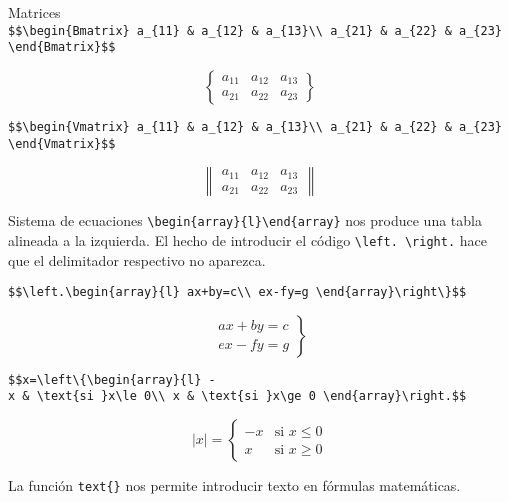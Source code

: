 \documentclass[
  ignorenonframetext,
]{beamer}
\begin{document}
\begin{frame}[fragile]{Matrices}
\label{matrices-2}
\texttt{\$\$\textbackslash{}begin\{Bmatrix\}\ a\_\{11\}\ \&\ a\_\{12\}\ \&\ a\_\{13\}\textbackslash{}\textbackslash{}\ a\_\{21\}\ \&\ a\_\{22\}\ \&\ a\_\{23\}\ \textbackslash{}end\{Bmatrix\}\$\$}

\[\begin{Bmatrix}
a_{11} & a_{12} & a_{13}\\
a_{21} & a_{22} & a_{23}
\end{Bmatrix}\]

\texttt{\$\$\textbackslash{}begin\{Vmatrix\}\ a\_\{11\}\ \&\ a\_\{12\}\ \&\ a\_\{13\}\textbackslash{}\textbackslash{}\ a\_\{21\}\ \&\ a\_\{22\}\ \&\ a\_\{23\}\ \textbackslash{}end\{Vmatrix\}\$\$}

\[\begin{Vmatrix}
a_{11} & a_{12} & a_{13}\\
a_{21} & a_{22} & a_{23}
\end{Vmatrix}\]
\end{frame}

\begin{frame}[fragile]{Sistema de ecuaciones}
\label{sistema-de-ecuaciones}
\texttt{\textbackslash{}begin\{array\}\{l\}\textbackslash{}end\{array\}}
nos produce una tabla alineada a la izquierda. El hecho de introducir el
código \texttt{\textbackslash{}left.\ \textbackslash{}right.} hace que
el delimitador respectivo no aparezca.

\texttt{\$\$\textbackslash{}left.\textbackslash{}begin\{array\}\{l\}\ ax+by=c\textbackslash{}\textbackslash{}\ ex-fy=g\ \textbackslash{}end\{array\}\textbackslash{}right\textbackslash{}\}\$\$}

\[\left.\begin{array}{l}
ax+by=c\\
ex-fy=g
\end{array}\right\}\]

\texttt{\$\$\textbar{}x\textbar{}=\textbackslash{}left\textbackslash{}\{\textbackslash{}begin\{array\}\{l\}\ -x\ \&\ \textbackslash{}text\{si\ \}x\textbackslash{}le\ 0\textbackslash{}\textbackslash{}\ x\ \&\ \textbackslash{}text\{si\ \}x\textbackslash{}ge\ 0\ \textbackslash{}end\{array\}\textbackslash{}right.\$\$}

\[|x|=\left\{\begin{array}{l}
-x & \text{si }x\le 0\\
x & \text{si }x\ge 0
\end{array}\right.\]

La función \texttt{text\{\}} nos permite introducir texto en fórmulas
matemáticas.
\end{frame}
\end{document}
